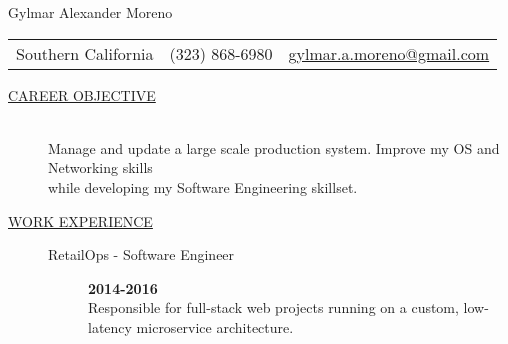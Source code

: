 \documentclass[12pt]{article}
\begin{document}
    \begin{center}
        {\LARGE Gylmar Alexander Moreno}
        \\
        \begin{tabular}{l|l|l}
            Southern California & (323) 868-6980 &
            \href{mailto:gylmar.a.moreno@gmail.com}{gylmar.a.moreno@gmail.com}
        \end{tabular}
    \end{center}
\begin{description}
    \item[\underline{CAREER OBJECTIVE}] \hfill \\
        Manage and update a large scale production system. Improve my OS and Networking skills\\while developing my Software Engineering skillset.

    \item[\underline{WORK EXPERIENCE}] \hfill
		\begin{description}
            \item[RetailOps - Software Engineer] \hfill \textbf{2014-2016}\\
                \hspace{-9mm}Responsible for full-stack web projects running on a custom, low-latency microservice architecture.


\end{description}
\end{description}
\end{document}
